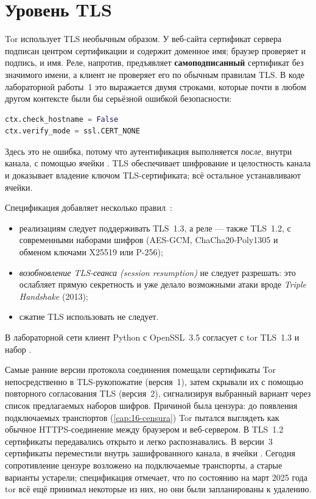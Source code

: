 \section{Уровень TLS}\label{sec:canale-tls}

Tor использует TLS необычным образом. У веб-сайта сертификат сервера подписан центром сертификации и содержит доменное имя; браузер проверяет и подпись, и имя. Реле, напротив, предъявляет \textbf{самоподписанный} сертификат без значимого имени, а клиент не проверяет его по обычным правилам TLS. В коде лабораторной работы~1 это выражается двумя строками, которые почти в любом другом контексте были бы серьёзной ошибкой безопасности:
\begin{lstlisting}[language=Python,numbers=none]
ctx.check_hostname = False
ctx.verify_mode = ssl.CERT_NONE
\end{lstlisting}
Здесь это не ошибка, потому что аутентификация выполняется \emph{после}, внутри канала, с помощью ячейки . TLS обеспечивает шифрование и целостность канала и доказывает владение ключом TLS-сертификата; всё остальное устанавливают ячейки.

Спецификация добавляет несколько правил~:
\begin{itemize}
  \item реализациям следует поддерживать TLS~1.3, а реле --- также TLS~1.2, с современными наборами шифров (AES-GCM, ChaCha20-Poly1305 и обменом ключами X25519 или P-256);
  \item \emph{возобновление TLS-сеанса (session resumption)} не следует разрешать: это ослабляет прямую секретность и уже делало возможными атаки вроде \emph{Triple Handshake} (2013);
  \item сжатие TLS использовать не следует.
\end{itemize}
В лабораторной сети клиент Python с OpenSSL~3.5 согласует с tor TLS~1.3 и набор .

\begin{storia}
Самые ранние версии протокола соединения помещали сертификаты Tor непосредственно в TLS-рукопожатие (версия~1), затем скрывали их с помощью повторного согласования TLS (версия~2), сигнализируя выбранный вариант через список предлагаемых наборов шифров. Причиной была цензура: до появления подключаемых транспортов (\cref{cap:16-censura}) Tor пытался выглядеть как обычное HTTPS-соединение между браузером и веб-сервером. В TLS~1.2 сертификаты передавались открыто и легко распознавались. В версии~3 сертификаты переместили внутрь зашифрованного канала, в ячейки . Сегодня сопротивление цензуре возложено на подключаемые транспорты, а старые варианты устарели; спецификация отмечает, что по состоянию на март 2025 года tor всё ещё принимал некоторые из них, но они были запланированы к удалению.
\end{storia}

